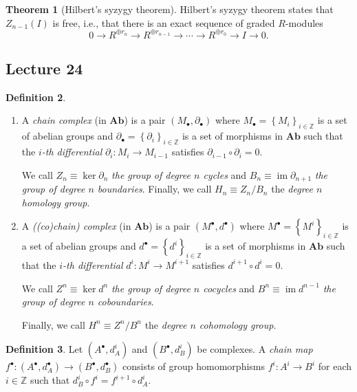 \documentclass[10pt,letterpaper,cm]{nupset}
\theoremstyle{definition}
\newtheorem{definition}{Definition}[subsection]
\theoremstyle{theorem}
\newtheorem{theorem}[definition]{Theorem}
\theoremstyle{remark}
\newcommand{\Z}{\mathbb Z}
\newcommand{\1}{\mathbf{1}}
\newcommand{\0}{\vec 0}
\DeclareMathOperator{\im}{im}
\begin{document}
\begin{theorem}[Hilbert's syzygy theorem]
Hilbert's syzygy theorem states that $Z_{n-1}(I)$ is free, i.e., that there is an exact sequence of graded $R$-modules $$0 \to R^{\oplus r_n} \to R^{\oplus r_{n-1}} \to \cdots \to R^{\oplus r_0} \to I \to 0.$$
\end{theorem}

\subsection{Lecture 24}

\begin{definition} $ $
\begin{enumerate}
\item  A \textit{chain complex} (in $\mathbf{Ab}$) is a pair $\left(M_{\bullet}, \partial_{\bullet}\right)$ where $M_{\bullet} = \left\{M_i\right\}_{i\in \Z}$ is a set of abelian groups and $\partial_{\bullet} =\left\{\partial_i\right\}_{i\in \Z}$ is a set of morphisms in $\mathbf{Ab}$ such that the \textit{$i$-th differential} $\partial_i : M_i \to M_{i-1}$ satisfies $\partial_{i-1} \circ \partial_i = 0$. 

We call $Z_n \equiv \ker{\partial_{n}}$ \textit{the group of degree $n$ cycles} and $B_n \equiv \im{\partial_{n+1}}$ \textit{the group of degree $n$ boundaries}. Finally, we call $H_n \equiv Z_n/B_n$ the \textit{degree $n$ homology group}.
\item A \textit{((co)chain) complex} (in $\mathbf{Ab}$) is a pair $\left(M^{\bullet}, d^{\bullet}\right)$ where $M^{\bullet} = \left\{M^i\right\}_{i\in \Z}$ is a set of abelian groups and $d^{\bullet} =\left\{d^i\right\}_{i\in \Z}$ is a set of morphisms in $\mathbf{Ab}$ such that the \textit{$i$-th differential} $d^i : M^i \to M^{i+1}$ satisfies $d^{i+1} \circ d^i = 0$. 

We call $Z^n \equiv \ker{d^n}$ \textit{the group of degree $n$ cocycles} and $B^n \equiv \im{d^{n-1}}$ \textit{the group of degree $n$ coboundaries}. 

Finally, we call $H^n \equiv Z^n/B^n$ the \textit{degree $n$ cohomology group}.
\end{enumerate}
\end{definition}

\begin{definition} Let $\left(A^{\bullet}, d_A^i\right)$ and $\left(B^{\bullet}, d_B^i\right)$ be complexes.
 A \textit{chain map} $f^{\bullet} : \left(A^{\bullet}, d_A^{\bullet}\right) \to \left(B^{\bullet}, d_B^{\bullet}\right)$ consists of group homomorphisms $f^i : A^i \to B^i$ for each $i\in \Z$ such that $d_B^i \circ f^i = f^{i+1} \circ d^i_A$. 
\end{definition}
\end{document}
